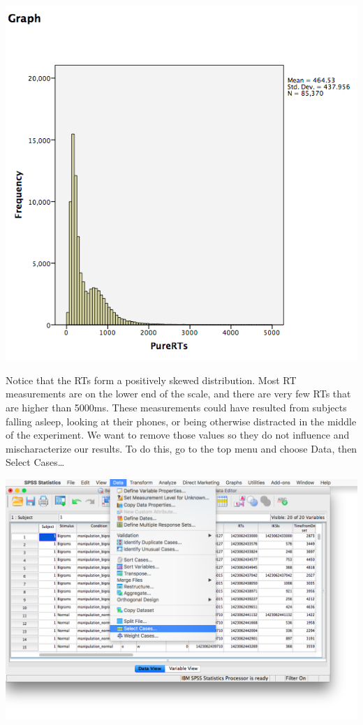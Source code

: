 \documentclass[
]{book}
\begin{document}
\includegraphics{img/9.4.14.png}

Notice that the RTs form a positively skewed distribution. Most RT measurements are on the lower end of the scale, and there are very few RTs that are higher than 5000ms. These measurements could have resulted from subjects falling asleep, looking at their phones, or being otherwise distracted in the middle of the experiment. We want to remove those values so they do not influence and mischaracterize our results. To do this, go to the top menu and choose {Data}, then {Select Cases\ldots{}}

\includegraphics{img/9.4.15.png}
\end{document}
